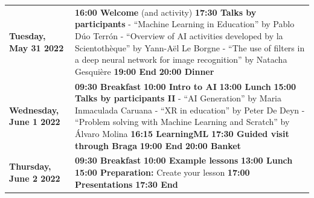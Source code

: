 \documentclass[11pt]{article}
\begin{document}
\begin{table}
\begin{center}
\begin{tabular}{m{6cm} m{8cm}}
        \centering\textbf{Tuesday, May 31 2022} &  \textbf{16:00 Welcome} (and activity) \newline
        \textbf{17:30 Talks by participants} \newline
        - ``Machine Learning in Education'' by Pablo Dúo Terrón \newline
        - ``Overview of AI activities developed by la Scientothèque'' by Yann-Aël Le Borgne \newline
        - ``The use of filters in a deep neural network for image recognition'' by Natacha Gesquière
        \newline
        \textbf{19:00 End} \newline
        \textbf{20:00 Dinner}
        \\ %
        \rowcolor{gray!15}
        \centering\textbf{Wednesday, June 1 2022} & \textbf{09:30 Breakfast} \newline \textbf{10:00 Intro to AI} \newline \textbf{13:00 Lunch} \newline 
        \textbf{15:00 Talks by participants II} \newline
        - ``AI Generation'' by Maria Inmaculada Caruana\newline
        - ``XR in education'' by Peter De Deyn \newline
        - ``Problem solving with Machine Learning and Scratch'' by Álvaro Molina
        \newline
        \textbf{16:15 LearningML} \newline
        \textbf{17:30 Guided visit through Braga} \newline
        \textbf{19:00 End} \newline
        \textbf{20:00 Banket}
        \\ 
        \centering\textbf{Thursday, June 2 2022} & \textbf{09:30 Breakfast} \newline \textbf{10:00 Example lessons} %
        \newline \textbf{13:00 Lunch} \newline
        \textbf{15:00 Preparation:} Create your lesson
        \newline
        \textbf{17:00 Presentations} \newline
        \textbf{17:30 End} \newline

\end{tabular}
\end{center}
\end{table}
\end{document}
